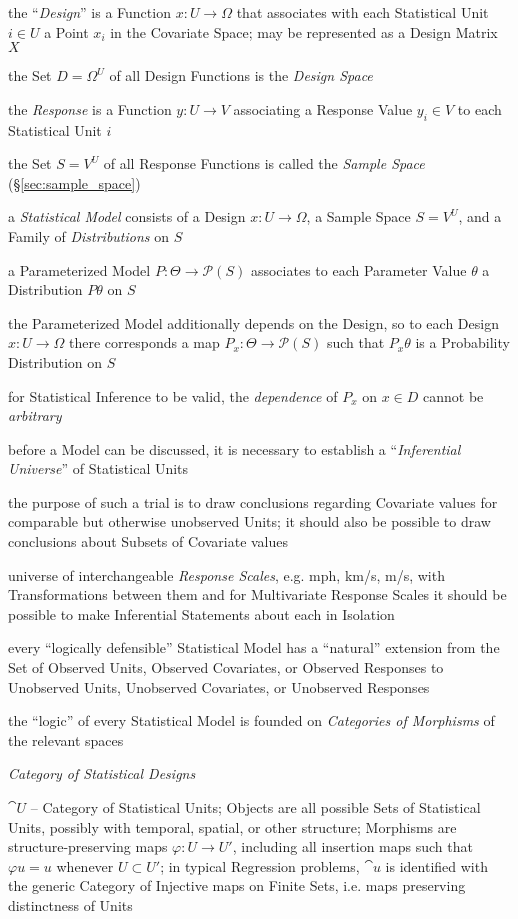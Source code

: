 the ``\emph{Design}'' is a Function $x : U \to \Omega$ that associates with each
Statistical Unit $i \in U$ a Point $x_i$ in the Covariate Space; may be
represented as a Design Matrix $X$

the Set $D = \Omega^U$ of all Design Functions is the \emph{Design Space}

the \emph{Response} is a Function $y : U \to V$ associating a Response Value
$y_i \in V$ to each Statistical Unit $i$

the Set $S = V^U$ of all Response Functions is called the \emph{Sample Space}
(\S\ref{sec:sample_space})

a \emph{Statistical Model} consists of a Design $x : U \to \Omega$, a Sample
Space $S = V^U$, and a Family of \emph{Distributions} on $S$

a Parameterized Model $P : \Theta \to \mathcal{P}(S)$ associates to each
Parameter Value $\theta$ a Distribution $P\theta$ on $S$

the Parameterized Model additionally depends on the Design, so to each Design
$x : U \to \Omega$ there corresponds a map $P_x : \Theta \to \mathcal{P}(S)$
such that $P_x\theta$ is a Probability Distribution on $S$

for Statistical Inference to be valid, the \emph{dependence} of $P_x$ on
$x \in D$ cannot be \emph{arbitrary}

before a Model can be discussed, it is necessary to establish a
``\emph{Inferential Universe}'' of Statistical Units

the purpose of such a trial is to draw conclusions regarding Covariate values
for comparable but otherwise unobserved Units; it should also be possible to
draw conclusions about Subsets of Covariate values

universe of interchangeable \emph{Response Scales}, e.g. mph, km/s, m/s, with
Transformations between them and for Multivariate Response Scales it should be
possible to make Inferential Statements about each in Isolation

every ``logically defensible'' Statistical Model has a ``natural'' extension
from the Set of Observed Units, Observed Covariates, or Observed Responses to
Unobserved Units, Unobserved Covariates, or Unobserved Responses

the ``logic'' of every Statistical Model is founded on \emph{Categories of
  Morphisms} of the relevant spaces

\emph{Category of Statistical Designs}

$\cat{U}$ -- Category of Statistical Units; Objects are all possible Sets of
Statistical Units, possibly with temporal, spatial, or other structure;
Morphisms are structure-preserving maps $\varphi : U \to U'$, including all
insertion maps such that $\varphi u = u$ whenever $U \subset U'$; in typical
Regression problems, $\cat{u}$ is identified with the generic Category of
Injective maps on Finite Sets, i.e. maps preserving distinctness of Units

